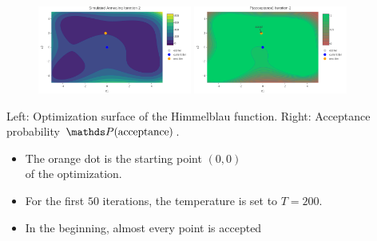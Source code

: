 \documentclass[11pt,compress,t,notes=noshow, xcolor=table]{beamer}
\begin{document}
\begin{frame}
\begin{center}
{    \begin{figure}
      \includegraphics[width=0.45\textwidth]{figure_man/sa-iter2.png}    \includegraphics[width=0.45\textwidth]{figure_man/sa-probs-iter2.png} \\
    \end{figure}
          \begin{tiny}
      Left: Optimization surface of the Himmelblau function. Right: Acceptance probability $\P(\text{acceptance})$. 
      \end{tiny} 

    \begin{itemize}
          \item The orange dot is the starting point $(0, 0)$ \\ of the optimization.
          \item For the first $50$ iterations, the temperature is set to $T = 200$. 
          \item In the beginning, almost every point is accepted
    \end{itemize}}%

\end{center}
\end{frame}
\end{document}
